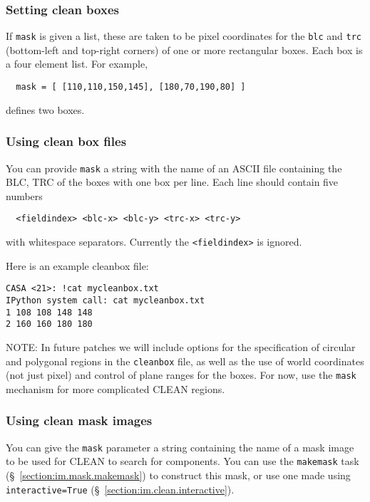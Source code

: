 \subsubsection{Setting clean boxes }
\label{section:im.clean.mask.box}

If {\tt mask} is given a list, these are taken to be pixel
coordinates for the {\tt blc} and {\tt trc} (bottom-left and top-right
corners) of one or more rectangular boxes.  Each box is a four element
list.  For example,
\small
\begin{verbatim}
  mask = [ [110,110,150,145], [180,70,190,80] ]
\end{verbatim}
\normalsize
defines two boxes.

\subsubsection{Using clean box files}
\label{section:im.clean.mask.boxfiles}

You can provide {\tt mask} a string with the name of  
an ASCII file containing the BLC, TRC of the boxes with one
box per line.  Each line should contain five numbers
\small
\begin{verbatim}
  <fieldindex> <blc-x> <blc-y> <trc-x> <trc-y>
\end{verbatim}
\normalsize
with whitespace separators.  Currently the {\tt <fieldindex>} is 
ignored.

Here is an example cleanbox file:
\small
\begin{verbatim}
CASA <21>: !cat mycleanbox.txt
IPython system call: cat mycleanbox.txt
1 108 108 148 148
2 160 160 180 180
\end{verbatim}
\normalsize

NOTE: In future patches we will include options for the specification
of circular and polygonal regions in the {\tt cleanbox} file, as
well as the use of world coordinates (not just pixel) and control
of plane ranges for the boxes.  For now, use the {\tt mask} mechanism
for more complicated CLEAN regions.

\subsubsection{Using clean mask images}
\label{section:im.clean.mask.maskimage}

You can give the {\tt mask} parameter a string containing the
name of a mask image to be used for CLEAN to search for components.  
You can use the {\tt makemask} task
(\S~\ref{section:im.mask.makemask}) to construct this mask, or use 
one made using {\tt interactive=True}
(\S~\ref{section:im.clean.interactive}).

